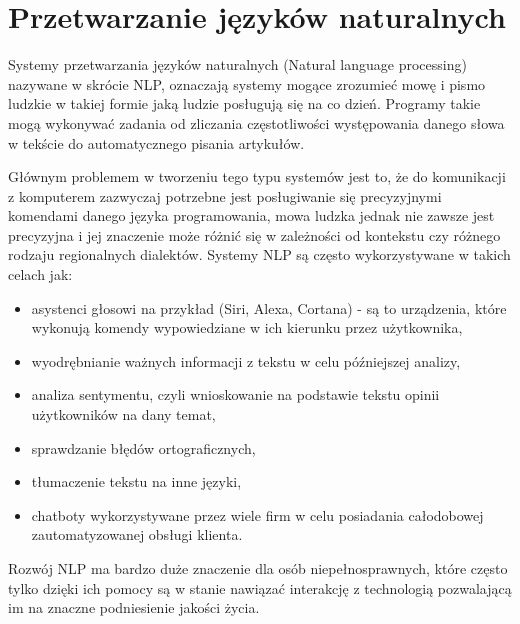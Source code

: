
\chapter{Przetwarzanie języków naturalnych}
Systemy przetwarzania języków naturalnych (Natural language processing) nazywane 
w skrócie NLP, oznaczają systemy mogące zrozumieć mowę i pismo ludzkie w takiej
formie jaką ludzie posługują się na co dzień. Programy takie mogą wykonywać zadania od zliczania
częstotliwości występowania danego słowa w tekście do automatycznego pisania artykułów. 

Głównym problemem w tworzeniu tego typu systemów jest to, że do komunikacji z komputerem zazwyczaj
potrzebne jest posługiwanie się precyzyjnymi komendami danego języka programowania, mowa ludzka
jednak nie zawsze jest precyzyjna i jej znaczenie może różnić się w zależności od kontekstu czy
różnego rodzaju regionalnych dialektów. Systemy NLP są często wykorzystywane w takich 
celach jak:
\begin{itemize}
    \item asystenci głosowi na przykład (Siri, Alexa, Cortana) - są to urządzenia, które 
    wykonują komendy wypowiedziane w ich kierunku przez użytkownika,
    \item wyodrębnianie ważnych informacji z tekstu w celu późniejszej analizy,
    \item analiza sentymentu, czyli wnioskowanie na podstawie tekstu opinii użytkowników na dany temat,
    \item sprawdzanie błędów ortograficznych,
    \item tłumaczenie tekstu na inne języki,
    \item chatboty wykorzystywane przez wiele firm w celu posiadania całodobowej zautomatyzowanej obsługi klienta.
\end{itemize}
Rozwój NLP ma bardzo duże znaczenie dla osób niepełnosprawnych, które często tylko dzięki ich pomocy są 
w stanie nawiązać interakcję z technologią pozwalającą im na znaczne podniesienie jakości życia. ~\cite{TextProcessing}
